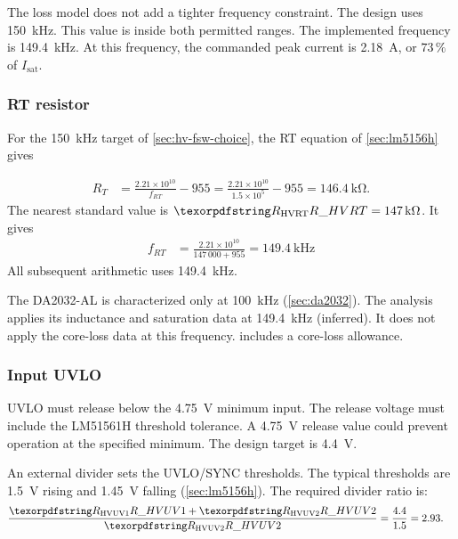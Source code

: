 The loss model does not add a tighter frequency constraint. The design uses
\SI{150}{\kilo\hertz}. This value is inside both permitted ranges. The implemented frequency
is \SI{149.4}{\kilo\hertz}. At this frequency, the commanded peak current is
\SI{2.18}{\ampere}, or $73\,\%$ of $I_{\mathrm{sat}}$.

\subsubsection{RT resistor}\label{sec:hv-fsw}

For the \SI{150}{\kilo\hertz} target of \cref{sec:hv-fsw-choice}, the RT
equation of \cref{sec:lm5156h} gives



\begin{align*}
  R_T &= \frac{2.21\times10^{10}}{f_{RT}} - 955
       = \frac{2.21\times10^{10}}{1.5\times10^{5}} - 955
       = \SI{146.4}{\kilo\ohm}.
\end{align*}
The nearest standard value is $\des{R}{HVRT} = \SI{147}{\kilo\ohm}$. It gives
\begin{align*}
  f_{RT} &= \frac{2.21\times10^{10}}{147\,000 + 955} = \SI{149.4}{\kilo\hertz}
\end{align*}
All subsequent arithmetic uses \SI{149.4}{\kilo\hertz}.


The DA2032-AL is characterized only at \SI{100}{\kilo\hertz}
(\cref{sec:da2032}). The analysis applies its inductance and saturation data at
\SI{149.4}{\kilo\hertz} (inferred). It does not apply the core-loss data at
this frequency.  includes a core-loss allowance.

\subsubsection{Input UVLO}\label{sec:hv-uvlo}

UVLO must release below the \SI{4.75}{\volt} minimum input. The release voltage
must include the LM51561H threshold tolerance. A \SI{4.75}{\volt} release value
could prevent operation at the specified minimum. The design target is
\SI{4.4}{\volt}.

An external divider sets the UVLO/SYNC thresholds. The typical thresholds are
\SI{1.5}{\volt} rising and \SI{1.45}{\volt} falling
(\cref{sec:lm5156h}). The required divider ratio is:
\begin{align*}
  \frac{\des{R}{HVUV1}+\des{R}{HVUV2}}{\des{R}{HVUV2}}
  &= \frac{4.4}{1.5} = 2.93.
\end{align*}

